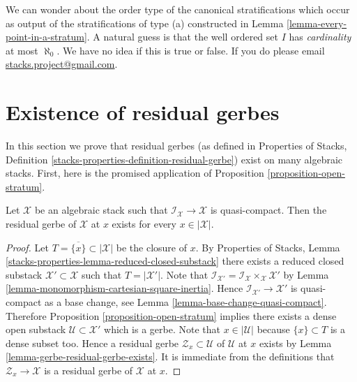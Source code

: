\begin{remark}
\label{remark-order-type}
We can wonder about the order type of the canonical stratifications which
occur as output of the stratifications of type (a) constructed in
Lemma \ref{lemma-every-point-in-a-stratum}.
A natural guess is that the well ordered set $I$ has
{\it cardinality} at most $\aleph_0$. We have no idea if this is true
or false. If you do please email
\href{mailto:stacks.project@gmail.com}{stacks.project@gmail.com}.
\end{remark}





\section{Existence of residual gerbes}
\label{section-existence-residual-gerbes}

\noindent
In this section we prove that residual gerbes (as defined in
Properties of Stacks, Definition
\ref{stacks-properties-definition-residual-gerbe})
exist on many algebraic stacks. First, here is the promised
application of
Proposition \ref{proposition-open-stratum}.

\begin{lemma}
\label{lemma-every-point-residual-gerbe}
Let $\mathcal{X}$ be an algebraic stack such that
$\mathcal{I}_\mathcal{X} \to \mathcal{X}$ is quasi-compact.
Then the residual gerbe of $\mathcal{X}$ at $x$ exists for
every $x \in |\mathcal{X}|$.
\end{lemma}

\begin{proof}
Let $T = \overline{\{x\}} \subset |\mathcal{X}|$ be the closure of $x$.
By
Properties of Stacks, Lemma
\ref{stacks-properties-lemma-reduced-closed-substack}
there exists a reduced closed substack $\mathcal{X}' \subset \mathcal{X}$
such that $T = |\mathcal{X}'|$. Note that
$\mathcal{I}_{\mathcal{X}'} =
\mathcal{I}_\mathcal{X} \times_\mathcal{X} \mathcal{X}'$ by
Lemma \ref{lemma-monomorphism-cartesian-square-inertia}.
Hence $\mathcal{I}_{\mathcal{X}'} \to \mathcal{X}'$ is
quasi-compact as a base change, see
Lemma \ref{lemma-base-change-quasi-compact}.
Therefore
Proposition \ref{proposition-open-stratum}
implies there exists a dense open substack
$\mathcal{U} \subset \mathcal{X}'$
which is a gerbe. Note that $x \in |\mathcal{U}|$ because $\{x\} \subset T$
is a dense subset too. Hence a residual gerbe
$\mathcal{Z}_x \subset \mathcal{U}$ of $\mathcal{U}$ at $x$ exists by
Lemma \ref{lemma-gerbe-residual-gerbe-exists}.
It is immediate from the definitions that $\mathcal{Z}_x \to \mathcal{X}$
is a residual gerbe of $\mathcal{X}$ at $x$.
\end{proof}

